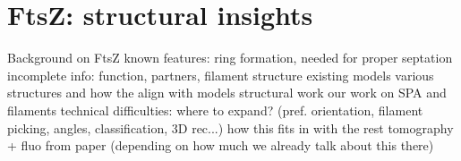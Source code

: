 \chapter{FtsZ: structural insights}

\begin{outline}
\1 Background on FtsZ
    \2 known features: ring formation, needed for proper septation
    \2 incomplete info: function, partners, filament structure
    \2 existing models
    \2 \cite{lutkenhausBacterialCytokinesisRing2012,szwedziakArchitectureRingFormed2014,fujitaStructuresFtsZSingle2023,sextonSuperresolutionConfocalCryoCLEM2022,liStructureFtsZFilaments2007}
    \2 various structures and how the align with models
\1 structural work
    \2 our work on SPA and filaments
        \3 technical difficulties: where to expand? (pref. orientation, filament picking, angles, classification, 3D rec...)
    \2 how this fits in with the rest
    \2 tomography + fluo from paper (depending on how much we already talk about this there)
        \2 
\end{outline}
